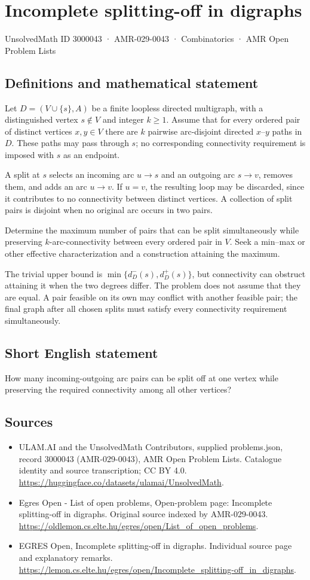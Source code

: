 \documentclass[11pt,a4paper]{article}
\begin{document}
\section*{Incomplete splitting-off in digraphs}\label{3000043}
{\small UnsolvedMath ID 3000043 · AMR-029-0043 · Combinatorics · AMR Open Problem Lists}
\subsection{Definitions and mathematical statement}
Let $D=(V\cup\{s\},A)$ be a finite loopless directed multigraph,
with a distinguished vertex $s\notin V$ and integer $k\ge1$.
Assume that for every ordered pair of distinct vertices $x,y\in V$
there are $k$ pairwise arc-disjoint directed $x$--$y$ paths in $D$.
These paths may pass through $s$; no corresponding connectivity
requirement is imposed with $s$ as an endpoint.

A split at $s$ selects an incoming arc $u\to s$ and an outgoing
arc $s\to v$, removes them, and adds an arc $u\to v$.
If $u=v$, the resulting loop may be discarded, since it contributes
to no connectivity between distinct vertices. A collection of split
pairs is disjoint when no original arc occurs in two pairs.

Determine the maximum number of pairs that can be split simultaneously
while preserving $k$-arc-connectivity between every ordered pair in
$V$. Seek a min--max or other effective characterization and a
construction attaining the maximum.

The trivial upper bound is $\min\{d_D^-(s),d_D^+(s)\}$, but connectivity
can obstruct attaining it when the two degrees differ. The problem
does not assume that they are equal. A pair feasible on its own may
conflict with another feasible pair; the final graph after all chosen
splits must satisfy every connectivity requirement simultaneously.
\subsection{Short English statement}
How many incoming-outgoing arc pairs can be split off at one
vertex while preserving the required connectivity among all other vertices?
\subsection{Sources}
\begin{itemize}
\item[S1] ULAM.AI and the UnsolvedMath Contributors, supplied problems.json, record 3000043 (AMR-029-0043), AMR Open Problem Lists. Catalogue identity and source transcription; CC BY 4.0.
\url{https://huggingface.co/datasets/ulamai/UnsolvedMath}.
\item[S2] Egres Open - List of open problems, Open-problem page: Incomplete splitting-off in digraphs. Original source indexed by AMR-029-0043.
\url{https://oldlemon.cs.elte.hu/egres/open/List_of_open_problems}.
\item[S3] EGRES Open, Incomplete splitting-off in digraphs. Individual source page and explanatory remarks.
\url{https://lemon.cs.elte.hu/egres/open/Incomplete_splitting-off_in_digraphs}.
\end{itemize}
\end{document}
